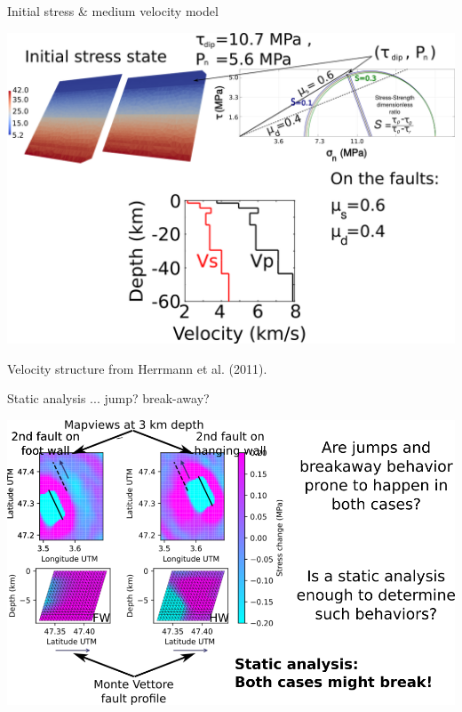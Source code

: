 \documentclass{beamer}
\begin{document}
\begin{frame}
 {Initial stress \& medium velocity model}

 \includegraphics[width=1\linewidth]{images/initial_stress}
 
 \hfill \vskip -1cm {\scriptsize Velocity structure from Herrmann et al. (2011).}

\end{frame}


\begin{frame}
 {Static analysis ... jump? break-away?}
 
 \begin{center}
 \begin{minipage}{1\linewidth}
  \includegraphics[width=1\linewidth]{images/static_analysis2.png}
 \end{minipage}
 \end{center}
 
\end{frame}
\end{document}
